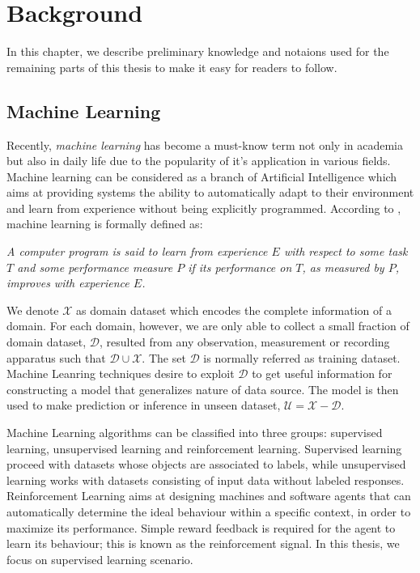\chapter{Background}
In this chapter, we describe preliminary knowledge and notaions used for the remaining parts of this thesis to make it easy for readers to follow.
\section{Machine Learning}
Recently, \textit{machine learning} has become a must-know term not only in academia but also in daily life due to the popularity of it's application in various fields. Machine learning can be considered as a branch of Artificial Intelligence which aims at providing systems the ability to automatically adapt to their environment and learn from experience without being explicitly programmed. According to \cite{mitchell1997machine}, machine learning is formally defined as:

\begin{definition}{}
\textit{A computer program is said to learn from experience $E$ with respect to some task $T$ and some performance measure $P$ if its performance on $T$, as measured by $P$, improves with experience $E$.}
\end{definition}

We denote $\mathcal{X}$ as domain dataset which encodes the complete information of a domain. For each domain, however, we are only able to collect a small fraction of domain dataset, $\mathcal{D}$, resulted from any observation, measurement or recording apparatus such that $\mathcal{D} \cup \mathcal{X}$. The set $\mathcal{D}$ is normally referred as training dataset. Machine Leanring techniques desire to exploit $\mathcal{D}$ to get useful information for constructing a model that generalizes nature of data source. The model is then used to make prediction or inference in unseen dataset, $\mathcal{U} = \mathcal{X} - \mathcal{D}$.

Machine Learning algorithms can be classified into three groups: supervised learning, unsupervised learning and reinforcement learning. Supervised learning proceed with datasets whose objects are associated to labels, while unsupervised learning works with datasets consisting of input data without labeled responses. Reinforcement Learning aims at designing machines and software agents that can automatically determine the ideal behaviour within a specific context, in order to maximize its performance. Simple reward feedback is required for the agent to learn its behaviour; this is known as the reinforcement signal. In this thesis, we focus on supervised learning scenario. 

